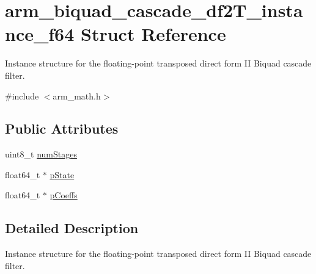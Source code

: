 \hypertarget{structarm__biquad__cascade__df2_t__instance__f64}{\section{arm\-\_\-biquad\-\_\-cascade\-\_\-df2\-T\-\_\-instance\-\_\-f64 Struct Reference}
\label{structarm__biquad__cascade__df2_t__instance__f64}
}


Instance structure for the floating-\/point transposed direct form I\-I Biquad cascade filter.  




{\ttfamily \#include $<$arm\-\_\-math.\-h$>$}

\subsection*{Public Attributes}
\begin{DoxyCompactItemize}
\item 
uint8\-\_\-t \hyperlink{structarm__biquad__cascade__df2_t__instance__f64_ad55380ff835b533aa5168f836db8a4de}{num\-Stages}
\item 
float64\-\_\-t $\ast$ \hyperlink{structarm__biquad__cascade__df2_t__instance__f64_a0bde57b618e3f9059b23b0de64e12ce3}{p\-State}
\item 
float64\-\_\-t $\ast$ \hyperlink{structarm__biquad__cascade__df2_t__instance__f64_ae2f0180f9038c0393e1d6921bb3b878b}{p\-Coeffs}
\end{DoxyCompactItemize}


\subsection{Detailed Description}
Instance structure for the floating-\/point transposed direct form I\-I Biquad cascade filter. 

